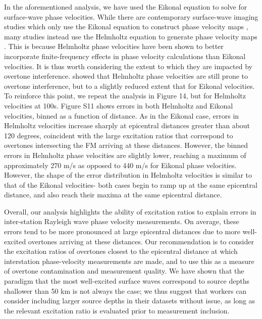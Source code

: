 \documentclass[extra,mreferee]{gji}
\begin{document}
In the aforementioned analysis, we have used the Eikonal equation to solve for surface-wave phase velocities. While there are contemporary surface-wave imaging studies which only use the Eikonal equation to construct phase velocity maps \cite[e.g.][]{ball2016lithospheric,gama2021shear,lehujeur2020validity}, many studies instead use the Helmholtz equation \citep{lin2011helmholtz} to generate phase velocity maps \cite[e.g.][]{jin2015surface,babikoff2019long,adams2018relationships}. This is because Helmholtz phase velocities have been shown to better incorporate finite-frequency effects in phase velocity calculations \citep{lin2011helmholtz} than Eikonal velocities. It is thus worth considering the extent to which they are impacted by overtone interference. \citet{hariharan2020evidence} showed that Helmholtz phase velocities are still prone to overtone interference, but to a slightly reduced extent that for Eikonal velocities. To reinforce this point, we repeat the analysis in Figure 14, but for Helmholtz velocities at 100s. Figure S11 shows errors in both Helmholtz and Eikonal velocities, binned as a function of distance. As in the Eikonal case, errors in Helmholtz velocities increase sharply at epicentral distances greater than about 120 degrees, coincident with the large excitation ratios that correspond to overtones intersecting the FM arriving at these distances. However, the binned errors in Helmholtz phase velocities are slightly lower, reaching a maximum of approximately 270 m/s as opposed to 440 m/s for Eikonal phase velocities. However, the shape of the error distribution in Helmholtz velocities is similar to that of the Eikonal velocities- both cases begin to ramp up at the same  epicentral distance, and also reach their maxima at the same epicentral distance.

Overall, our analysis highlights the ability of excitation ratios to explain errors in inter-station Rayleigh wave phase velocity measurements. On average, these errors tend to be more pronounced at large epicentral distances due to more well-excited overtones arriving at these distances. Our recommendation is to consider the excitation ratios of overtones closest to the epicentral distance at which interstation phase-velocity measurements are made, and to use this as a measure of overtone contamination and measurement quality. We have shown that the paradigm that the most well-excited surface waves correspond to source depths shallower than 50 km is not always the case; we thus suggest that workers can consider including larger source depths in their datasets without issue, as long as the relevant excitation ratio is evaluated prior to measurement inclusion.
\end{document}
